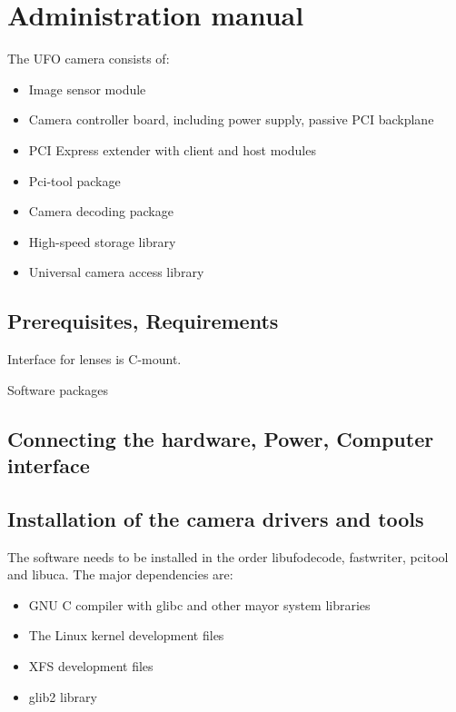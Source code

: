 %

\chapter{Administration manual}

The UFO camera consists of: 
\begin{itemize}
\item Image sensor module
\item Camera controller board, including power supply, passive PCI backplane
\item PCI Express extender with client and host modules
\item Pci-tool package
\item Camera decoding package
\item High-speed storage library
\item Universal camera access library
\end{itemize}

\section{Prerequisites, Requirements}

Interface for lenses is C-mount.

Software packages


\section{Connecting the hardware, Power, Computer interface}



\section{Installation of the camera drivers and tools}

The software needs to be installed in the order libufodecode, fastwriter, pcitool and libuca. The major dependencies are:
\begin{itemize}
\item GNU C compiler with glibc and other mayor system libraries
\item The Linux kernel development files
\item XFS development files
\item glib2 library
\end{itemize}
    

